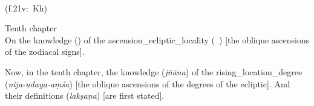 \begin{multicols}{2}
\noindent\reversemarginpar{}%
\columnbreak

\noindent\normalmarginpar{}%
\\
\enskip (f.\thinspace 21v:~Kh)
\end{multicols}%
%
\begin{multicols}{2}
Tenth chapter\\
On the \gls{knowledge} (\marifat) of the \gls{ascension_ecliptic_locality} (\matali\idafaconsonant\ \balad) [\ie the oblique ascensions of the zodiacal signs].
\columnbreak

Now, in the tenth chapter, the \gls{knowledge} (\textit{jñāna}) of the \gls{rising_location_degree} (\textit{nija-udaya-aṃśa}) [\ie the oblique ascensions of the degrees of the ecliptic]. And their \glspl{definition} (\textit{lakṣaṇa}) [are first stated]. 
\end{multicols}

\newpage %


